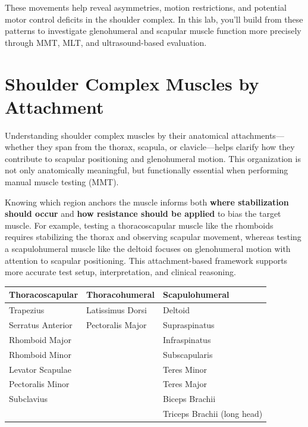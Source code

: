 These movements help reveal asymmetries, motion restrictions, and potential motor control deficits in the shoulder complex. In this lab, you'll build from these patterns to investigate glenohumeral and scapular muscle function more precisely through MMT, MLT, and ultrasound-based evaluation.

\section*{Shoulder Complex Muscles by Attachment}

\noindent
Understanding shoulder complex muscles by their anatomical attachments—whether they span from the thorax, scapula, or clavicle—helps clarify how they contribute to scapular positioning and glenohumeral motion. This organization is not only anatomically meaningful, but functionally essential when performing manual muscle testing (MMT). 

Knowing which region anchors the muscle informs both \textbf{where stabilization should occur} and \textbf{how resistance should be applied} to bias the target muscle. For example, testing a thoracoscapular muscle like the rhomboids requires stabilizing the thorax and observing scapular movement, whereas testing a scapulohumeral muscle like the deltoid focuses on glenohumeral motion with attention to scapular positioning. This attachment-based framework supports more accurate test setup, interpretation, and clinical reasoning.

\vspace{.5cm}

\begin{tabular}{|p{4.5cm}|p{4.5cm}|p{5cm}|}
\hline
\textbf{Thoracoscapular} & \textbf{Thoracohumeral} & \textbf{Scapulohumeral} \\
\hline
Trapezius &
Latissimus Dorsi &
Deltoid  \\
Serratus Anterior &
Pectoralis Major &
Supraspinatus \\
Rhomboid Major &
 &
Infraspinatus \\
Rhomboid Minor &
 &
Subscapularis \\
Levator Scapulae &
 &
Teres Minor \\
Pectoralis Minor &
 &
Teres Major \\
Subclavius &
 &
Biceps Brachii  \\
 &
 &
Triceps Brachii (long head) \\
\hline
\end{tabular}

